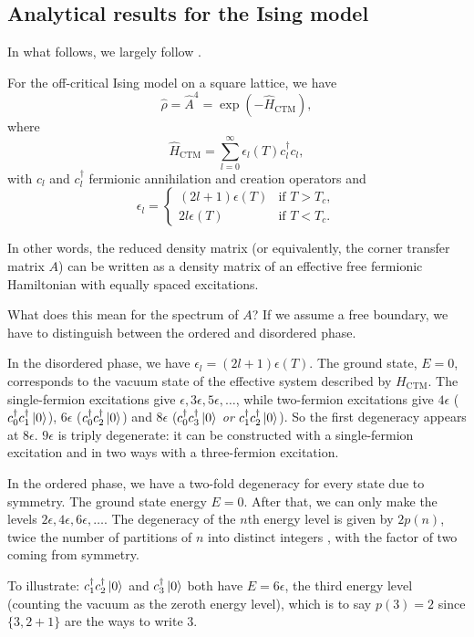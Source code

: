 \subsection{Analytical results for the Ising model}
In what follows, we largely follow \cite{peschel2009reduced, peschel1999density}.

For the off-critical Ising model on a square lattice, we have \cite{davies1988corner}
\begin{equation}
  \hat{\rho} = \hat{A}^4 = \exp(-\hat{H}_{\text{CTM}}),
\end{equation}
where
\begin{equation}
  \hat{H}_{\text{CTM}} = \sum_{l = 0}^{\infty} \epsilon_l(T) c^{\dagger}_l c_l,
\end{equation}
with $c_l$ and $c^{\dagger}_l$ fermionic annihilation and creation operators and
\begin{equation}
  \epsilon_l =
  \begin{cases}
    (2l + 1)\epsilon(T) & \text{if } T > T_c, \\
    2l\epsilon(T) & \text{if } T < T_c.
  \end{cases}
\end{equation}

In other words, the reduced density matrix (or equivalently, the corner transfer matrix $A$) can be written as a
density matrix of an effective free fermionic Hamiltonian with equally spaced excitations.

What does this mean for the spectrum of $A$?
If we assume a free boundary, we have to distinguish between the ordered and disordered phase.

In the disordered phase, we have $\epsilon_l = (2l + 1)\epsilon(T)$.
The ground state, $E = 0$, corresponds to the vacuum state of the effective system described by $H_{\text{CTM}}$.
The single-fermion excitations give $\epsilon, 3\epsilon, 5\epsilon,
\dots$, while two-fermion excitations give $4\epsilon$ ($c^{\dagger}_0 c^{\dagger}_1 \ket{0}$),
$6\epsilon$ ($c^{\dagger}_0 c^{\dagger}_2 \ket{0}$) and $8\epsilon$ ($c^{\dagger}_0 c^{\dagger}_3 \ket{0}$ \emph{or}
$c^{\dagger}_1 c^{\dagger}_2 \ket{0}$).
So the first degeneracy appears at $8\epsilon$.
$9\epsilon$ is triply degenerate:
it can be constructed with a single-fermion excitation and in two ways with a three-fermion excitation.

In the ordered phase, we have a two-fold degeneracy for every state due to symmetry.
The ground state energy $E = 0$.
After that, we can only make the levels $2\epsilon, 4\epsilon, 6\epsilon,
\dots$.
The degeneracy of the $n$th energy level is given by $2p(n)$, twice the number of partitions of $n$ into distinct integers
\cite{okunishi1999universal}, with the factor of two coming from symmetry.

To illustrate:
$c^{\dagger}_1 c^{\dagger}_2 \ket{0}$ and $c^{\dagger}_3 \ket{0}$ both have $E = 6\epsilon$,
the third energy level (counting the vacuum as the zeroth energy level),
which is to say $p(3) = 2$ since $\{3, 2 + 1 \}$ are the ways to write $3$.

